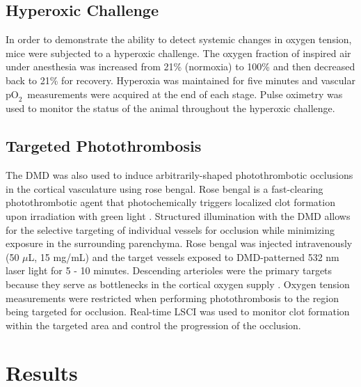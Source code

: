 \documentclass[12pt]{spieman}  %
\newcommand{\pO}{\ensuremath{\text{pO}_2}} 	            %
\begin{document}
\begin{spacing}{2}

\subsection{Hyperoxic Challenge}
In order to demonstrate the ability to detect systemic changes in oxygen tension, mice were subjected to a hyperoxic challenge. The oxygen fraction of inspired air under anesthesia was increased from 21\% (normoxia) to 100\% and then decreased back to 21\% for recovery. Hyperoxia was maintained for five minutes and vascular \pO\ measurements were acquired at the end of each stage. Pulse oximetry was used to monitor the status of the animal throughout the hyperoxic challenge.


\subsection{Targeted Photothrombosis}
The DMD was also used to induce arbitrarily-shaped photothrombotic occlusions in the cortical vasculature using rose bengal. Rose bengal is a fast-clearing photothrombotic agent that photochemically triggers localized clot formation upon irradiation with green light \cite{Watson:1985bp,Klaassen:1976kg,Wilson:1991tv}. Structured illumination with the DMD allows for the selective targeting of individual vessels for occlusion while minimizing exposure in the surrounding parenchyma. Rose bengal was injected intravenously (50 $\mu$L, 15 mg/mL) and the target vessels exposed to DMD-patterned 532 nm laser light for 5 - 10 minutes. Descending arterioles were the primary targets because they serve as bottlenecks in the cortical oxygen supply \cite{Nishimura:2007hk}. Oxygen tension measurements were restricted when performing photothrombosis to the region being targeted for occlusion. Real-time LSCI was used to monitor clot formation within the targeted area and control the progression of the occlusion.


\section{Results}
\label{sect:results}


\end{spacing}
\end{document}
